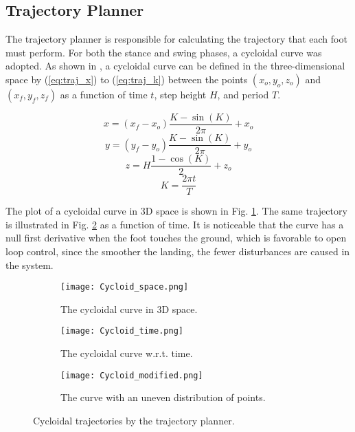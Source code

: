 \documentclass[conference]{IEEEtran}
\begin{document}
\subsection{Trajectory Planner}

The trajectory planner is responsible for calculating the trajectory that each foot must perform. For both the stance and swing phases, a cycloidal curve was adopted. As shown in \cite{Shi2021}, a cycloidal curve can be defined in the three-dimensional space by (\ref{eq:traj_x}) to (\ref{eq:traj_k})
between the points $(x_o, y_o, z_o)$ and $(x_f, y_f, z_f)$ as a function of time $t$, step height $H$, and period $T$.

\begin{equation}
  x = (x_f - x_o) \frac{K - \sin{(K)}}{2 \pi} + x_o
  \label{eq:traj_x}
\end{equation}
\begin{equation}
  y = (y_f - y_o) \frac{K - \sin{(K)}}{2 \pi} + y_o
  \label{eq:traj_y}
\end{equation}
\begin{equation}
  z = H \frac{1 - \cos{(K)}}{2} + z_o
  \label{eq:traj_z}
\end{equation}
\begin{equation}
  K = \frac{2 \pi t}{T}
  \label{eq:traj_k}
\end{equation}

The plot of a cycloidal curve in 3D space is shown in Fig. \ref{fig:traj_space}. The same trajectory is illustrated in Fig. \ref{fig:traj_time} as a function of time. It is noticeable that the curve has a null first derivative when the foot touches the ground, which is favorable to open loop control, since the smoother the landing, the fewer disturbances are caused in the system.

\begin{figure*}[h]
  \centering
  \begin{subfigure}[t]{0.32\textwidth}
    \centering
    \texttt{[image: Cycloid\_space.png]}
    \caption{The cycloidal curve in 3D space.}
    \label{fig:traj_space}
  \end{subfigure}
  \begin{subfigure}[t]{0.32\textwidth}
    \centering
    \texttt{[image: Cycloid\_time.png]}
    \caption{The cycloidal curve w.r.t. time.}
    \label{fig:traj_time}
  \end{subfigure}
  \begin{subfigure}[t]{0.32\textwidth}
    \centering
    \texttt{[image: Cycloid\_modified.png]}
    \caption{The curve with an uneven distribution of points.}
    \label{fig:traj_time_modified}
  \end{subfigure}
  \vfill
  \caption{Cycloidal trajectories by the trajectory planner.}
  \label{fig:traj_curve}
  \vspace{-\baselineskip}
\end{figure*}
\end{document}
